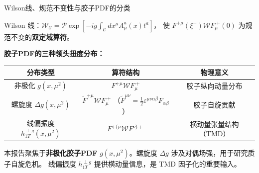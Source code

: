 \documentclass[10pt,aspectratio=169]{beamer}
\begin{document}
\begin{frame}{Wilson线、规范不变性与胶子PDF的分类}

  Wilson 线：$\mathcal{W}_{\mathcal{C}} = \mathcal{P}\exp[-ig \int_{\mathcal{C}} dx^\mu A_\mu^a(x) t^a]$，
  使 $F^{+\mu}(\xi^{-}) \mathcal{W} F_{\mu}^{\;+}(0)$ 为规范不变的\textbf{双定域算符}。

  \textbf{胶子PDF的三种领头扭度分布：}
  \begin{center}
  \begin{tabular}{c|c|c}
    \hline
    \textbf{分布类型} & \textbf{算符结构} & \textbf{物理意义} \\
    \hline
    非极化 $g(x,\mu^2)$ &
    $F^{+\mu}\mathcal{W} F_{\mu}^{\;+}$ &
    胶子纵向动量分布 \\
    \hline
    螺旋度 $\Delta g(x,\mu^2)$ &
    $\tilde{F}^{+\mu}\mathcal{W} F_{\mu}^{\;+}$
    （$\tilde{F}^{\mu\nu} = \frac{1}{2}\varepsilon^{\mu\nu\alpha\beta}F_{\alpha\beta}$） &
    胶子自旋贡献 \\
    \hline
    线偏振度 $h_{1T}^{\perp g}(x,\mu^2)$ &
    $F^{+\{\mu} \mathcal{W} F^{\nu\}+}$ &
    横动量张量结构（TMD） \\
    \hline
  \end{tabular}
  \end{center}

  本报告聚焦于\textbf{非极化胶子PDF} $g(x,\mu^2)$。螺旋度 $\Delta g$ 涉及对偶场强，用于研究质子自旋危机。
  线偏振度 $h_{1T}^{\perp g}$ 提供横动量信息，是 TMD 因子化的重要输入。
\end{frame}
\end{document}
